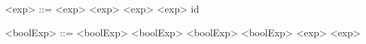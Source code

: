 \begin{grammarEx}
	<exp> ::= <exp> \lit{+} <exp>
	\alt <exp> \lit{*} <exp>
	\alt id

	<boolExp> ::= <boolExp> \lit{\&\&} <boolExp>
	\alt <boolExp> \lit{\textbar\textbar} <boolExp>
	\alt <exp>  <exp>
	\alt {}
	\alt {}
\end{grammarEx}
